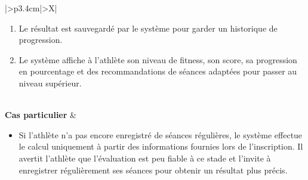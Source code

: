 \documentclass[a4paper,12pt]{report}
\begin{document}
\begin{table}[H]
\begin{tabularx}{\textwidth}{|>{\RaggedRight\arraybackslash}p{3.4cm}|>{\RaggedRight\arraybackslash}X|}
\begin{minipage}[t]{\linewidth}
\begin{enumerate}[label=\arabic*., leftmargin=*, topsep=0pt, itemsep=1pt]
    \item Le résultat est sauvegardé par le système pour garder un historique de progression.
    \item Le système affiche à l'athlète son niveau de fitness, son score, sa progression en pourcentage et des recommandations de séances adaptées pour passer au niveau supérieur.
\end{enumerate}
\vspace{2pt}
\end{minipage} \\
\hline
\textbf{Cas particulier} &
\begin{minipage}[t]{\linewidth}
\vspace{2pt}
\begin{itemize}[leftmargin=*, topsep=0pt, itemsep=1pt]
    \item Si l'athlète n'a pas encore enregistré de séances régulières, le système effectue le calcul uniquement à partir des informations fournies lors de l'inscription. Il avertit l'athlète que l'évaluation est peu fiable à ce stade et l'invite à enregistrer régulièrement ses séances pour obtenir un résultat plus précis.
\end{itemize}
\vspace{2pt}
\end{minipage} \\
\hline
\end{tabularx}
\fussy
\end{table}
\setlength{\emergencystretch}{3em}
\end{document}
